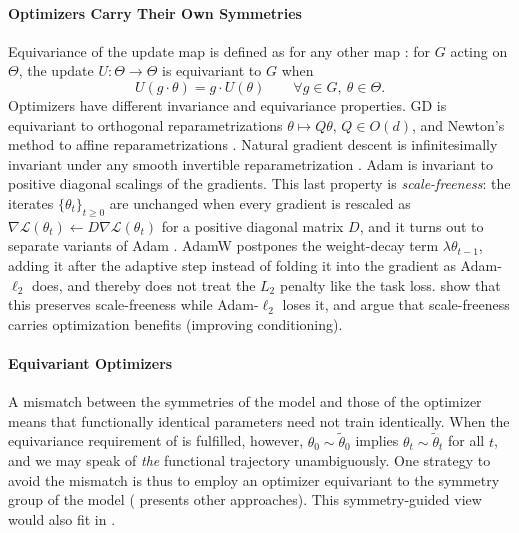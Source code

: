 \documentclass[mathematics,review,submit,moreauthors]{Definitions/mdpi}
\begin{document}
\paragraph{Optimizers Carry Their Own Symmetries}
Equivariance of the update map is defined as for any other map \citep{neyshabur2015anips,yi2022ptcuai,yen2025iclr,zhao2025,yang2025}: for $G$ acting on $\Theta$, the update $U:\Theta\to\Theta$ is equivariant to $G$ when
\begin{equation}\label{eq:equivariant-optimizer}
    U(g\cdot\theta)=g\cdot U(\theta)\qquad\forall g\in G,\ \theta\in\Theta.
\end{equation}
Optimizers have different invariance and equivariance properties.
GD is equivariant to orthogonal reparametrizations $\theta\mapsto Q\theta$, $Q\in O(d)$, and Newton's method to affine reparametrizations \citep{kristiadi2023anips}.
Natural gradient descent is infinitesimally invariant under any smooth invertible reparametrization \citep{amari1998nc,liang2019pticais,kristiadi2023anips,zhao2025}.
Adam \citep{kingma2015} is invariant to positive diagonal scalings of the gradients.
This last property is \emph{scale-freeness}: the iterates $\{\theta_t\}_{t\geq0}$ are unchanged when every gradient is rescaled as $\nabla\mathcal{L}(\theta_t)\gets D\nabla\mathcal{L}(\theta_t)$ for a positive diagonal matrix $D$, and it turns out to separate variants of Adam \citep{zhuang2022tmlr}.
AdamW postpones the weight-decay term $\lambda\theta_{t-1}$, adding it after the adaptive step instead of folding it into the gradient as Adam-$\ell_2$ does, and thereby does not treat the $L_2$ penalty like the task loss.
\citet{zhuang2022tmlr} show that this preserves scale-freeness while Adam-$\ell_2$ loses it, and argue that scale-freeness carries optimization benefits (improving conditioning).

\paragraph{Equivariant Optimizers}
A mismatch between the symmetries of the model and those of the optimizer means that functionally identical parameters need not train identically.
When the equivariance requirement of  is fulfilled, however, $\theta_0\sim\tilde{\theta}_0$ implies $\theta_t\sim\tilde{\theta}_t$ for all $t$, and we may speak of \emph{the} functional trajectory unambiguously.
One strategy to avoid the mismatch is thus to employ an optimizer equivariant to the symmetry group of the model ( presents other approaches).
This symmetry-guided view would also fit in .
\end{document}
